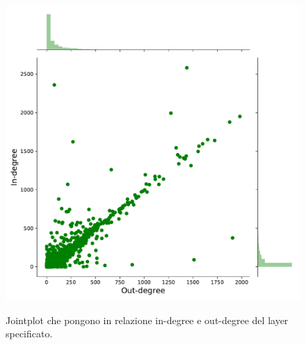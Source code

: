\begin{figure}
{	\includegraphics[width=.55\linewidth]{images/Aggregate/Degree/jointplot/trades_jointplot}
	}
	\caption{Jointplot che pongono in relazione in-degree e out-degree del layer specificato.}
	\label{fig:join_degree}
\end{figure}

